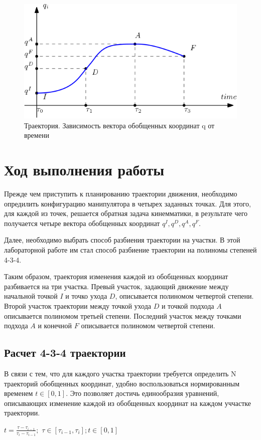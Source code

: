 \documentclass[a4paper,14pt]{extreport}
\begin{document}
	\begin{figure}[H]
	\center\includegraphics[width=0.8\linewidth]{trajectory.png}
	\caption{Траектория. Зависимость вектора обобщенных координат q от времени}
	\label{fig:scr1}
	\end{figure}

\section{Ход выполнения работы}
	Прежде чем приступить к планированию траектории движения, необходимо опредилить конфигурацию манипулятора в четырех заданных точках. Для этого, для каждой из точек, решается обратная задача кинемматики, в результате чего получается четыре вектора обобщенных координат $q^I, q^D, q^A, q^F$.
	
	Далее, необходимо выбрать способ разбиения траектории на участки. В этой лабораторной работе им стал способ разбиение траектории на полиномы степеней 4-3-4.
	
	Таким образом, траектория изменения каждой из обобщенных координат разбивается на три участка. Превый участок, задающий движение между начальной точкой $I$ и точко ухода $D$, описывается полиномом четвертой степени. Второй участок траектории между точкой ухода $D$ и точкой подхода $A$ описывается полиномом третьей степени. Последний участок между точками подхода $A$ и конечной $F$ описывается полиномом четвертой степени.
	
	\subsection{Расчет 4-3-4 траектории}
	В связи с тем, что для каждого участка траектории требуется определить N траекторий обобщенных координат, удобно воспользоваться нормированным временем $t \in [0, 1]$. Это позволяет достичь единообразия уравнений, описывающих изменение каждой из обобщенных координат на каждом уччастке траектории.
	\begin{center}
		$t = \frac{\tau - \tau_{i-1}}{\tau_{i} - \tau_{i-1}};$
		$\tau \in [\tau_{i-1}, \tau_{i}]; t \in [0, 1]$	
			\\
	\end{center}
	 
\end{document}
